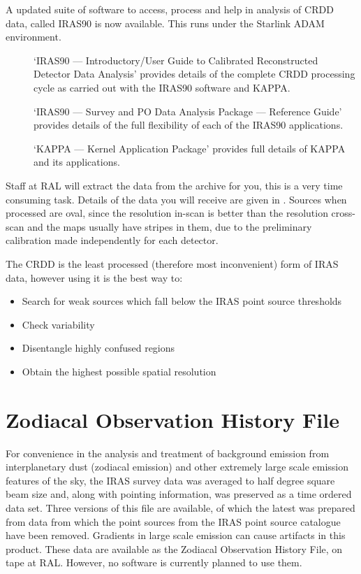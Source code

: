 \documentclass[11pt,nolof,noabs]{starlink}
\begin{document}
A updated suite of software to access, process and help in analysis of CRDD
data, called IRAS90 is now available. This runs under the Starlink ADAM
environment.
\begin{description}
\item [] `IRAS90 --- Introductory/User Guide to Calibrated
Reconstructed Detector Data Analysis' provides details of the complete CRDD
processing cycle as carried out with the IRAS90 software and KAPPA.
\item [] `IRAS90 --- Survey and PO Data Analysis Package --- Reference
Guide' provides details of the full flexibility of each of the IRAS90
applications.
\item [] `KAPPA --- Kernel Application Package' provides full details of
KAPPA and its applications.
\end{description}

Staff at RAL will extract the data from the archive for you, this is a very
time consuming task. Details of the data you will receive are given in .
Sources when processed are oval, since the resolution in-scan is better than the
resolution cross-scan and the maps usually have stripes in them, due to the
preliminary calibration made independently for each detector.

The CRDD is the least processed (therefore most inconvenient) form of IRAS data,
however using it is the best way to:
\begin{itemize}
\item Search for weak sources which fall below the IRAS point source thresholds
\item Check variability
\item Disentangle highly confused regions
\item Obtain the highest possible spatial resolution
\end{itemize}

\section{Zodiacal Observation History File}
\label{m:zodiac}
For convenience in the analysis and treatment of background emission from
interplanetary dust (zodiacal emission) and other extremely large scale emission
features of the sky, the IRAS survey data was averaged to half degree square
beam size and, along with pointing information, was preserved as a time ordered
data set.
Three versions of this file are available, of which the latest was prepared from
data from which the point sources from the IRAS point source catalogue have been
removed. Gradients in large scale emission can cause artifacts in this product.
These data are available as the Zodiacal Observation History File, on tape at
RAL. However, no software is currently planned to use them.
\end{document}
